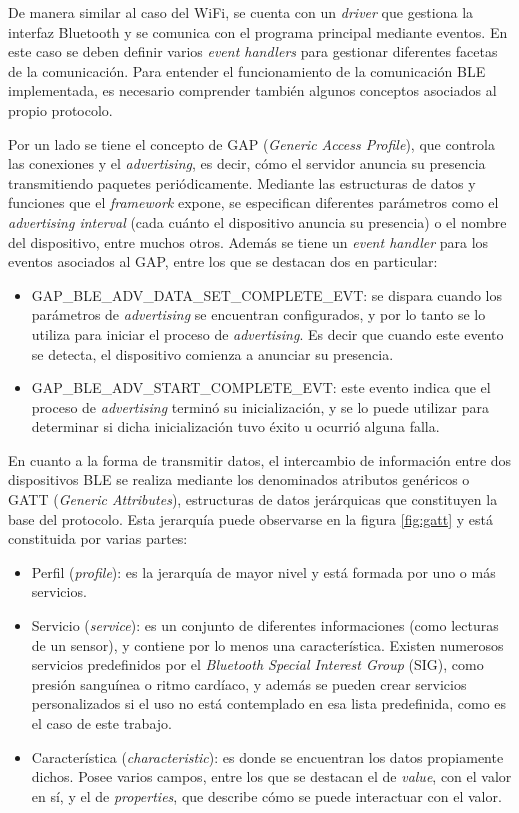 De manera similar al caso del WiFi, se cuenta con un \emph{driver} que gestiona la interfaz Bluetooth y se comunica con el programa principal mediante eventos. En este caso se deben definir varios \emph{event handlers} para gestionar diferentes facetas de la comunicación. Para entender el funcionamiento de la comunicación BLE implementada, es necesario comprender también algunos conceptos asociados al propio protocolo. 

Por un lado se tiene el concepto de GAP (\emph{Generic Access Profile}), que controla las conexiones y el \emph{advertising}, es decir, cómo el servidor anuncia su presencia transmitiendo paquetes periódicamente. Mediante las estructuras de datos y funciones que el \emph{framework} expone, se especifican diferentes parámetros como el \emph{advertising interval} (cada cuánto el dispositivo anuncia su presencia) o el nombre del dispositivo, entre muchos otros. Además se tiene un \emph{event handler} para los eventos asociados al GAP, entre los que se destacan dos en particular:

\begin{itemize}
	\item GAP\_BLE\_ADV\_DATA\_SET\_COMPLETE\_EVT: se dispara cuando los parámetros de \emph{advertising} se encuentran configurados, y por lo tanto se lo utiliza para iniciar el proceso de \emph{advertising}. Es decir que cuando este evento se detecta, el dispositivo comienza a anunciar su presencia.
	\item GAP\_BLE\_ADV\_START\_COMPLETE\_EVT: este evento indica que el proceso de \emph{advertising} terminó su inicialización, y se lo puede utilizar para determinar si dicha inicialización tuvo éxito u ocurrió alguna falla. 
\end{itemize}

En cuanto a la forma de transmitir datos, el intercambio de información entre dos dispositivos BLE se realiza mediante los denominados atributos genéricos o GATT (\emph{Generic Attributes}), estructuras de datos jerárquicas que constituyen la base del protocolo. Esta jerarquía puede observarse en la figura \ref{fig:gatt} y está constituida por varias partes:

\begin{itemize}
	\item Perfil (\emph{profile}): es la jerarquía de mayor nivel y está formada por uno o más servicios.
	\item Servicio (\emph{service}): es un conjunto de diferentes informaciones (como lecturas de un sensor), y contiene por lo menos una característica. Existen numerosos servicios predefinidos por el \emph{Bluetooth Special Interest Group} (SIG), como presión sanguínea o ritmo cardíaco, y además se pueden crear servicios personalizados si el uso no está contemplado en esa lista predefinida, como es el caso de este trabajo.
	\item Característica (\emph{characteristic}): es donde se encuentran los datos propiamente dichos. Posee varios campos, entre los que se destacan el de \emph{value}, con el valor en sí, y el de \emph{properties}, que describe cómo se puede interactuar con el valor.
\end{itemize}

